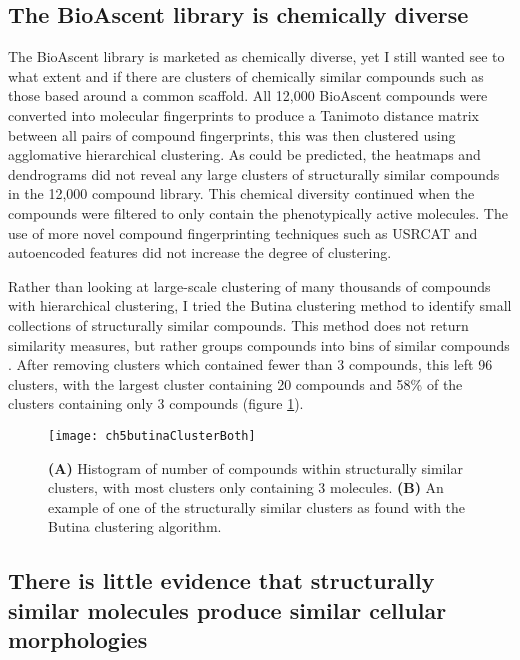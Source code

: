 \documentclass[a4paper,11pt,twoside,openright]{scrbook}
\begin{document}
\subsection{The BioAscent library is chemically diverse}
The BioAscent library is marketed as chemically diverse, yet I still wanted see to what extent and if there are clusters of chemically similar compounds such as those based around a common scaffold.
All 12,000 BioAscent compounds were converted into molecular fingerprints to produce a Tanimoto distance matrix between all pairs of compound fingerprints, this was then clustered using agglomative hierarchical clustering.
As could be predicted, the heatmaps and dendrograms did not reveal any large clusters of structurally similar compounds in the 12,000 compound library.
This chemical diversity continued when the compounds were filtered to only contain the phenotypically active molecules.
The use of more novel compound fingerprinting techniques such as USRCAT \cite{Schreyer2012} and autoencoded features \cite{Gomez-Bombarelli2016} did not increase the degree of clustering.


Rather than looking at large-scale clustering of many thousands of compounds with hierarchical clustering, I tried the Butina clustering method to identify small collections of structurally similar compounds.
This method does not return similarity measures, but rather groups compounds into bins of similar compounds \cite{Butina1999}.
After removing clusters which contained fewer than 3 compounds, this left 96 clusters, with the largest cluster containing 20 compounds and 58\% of the clusters containing only 3 compounds (figure \ref{figure:butina_clusters}).

\begin{figure}
    \captionsetup{width=0.8\textwidth}
    \caption[Histogram of structural cluster sizes and example of molecules within a cluster]{
        \textbf{(A)} Histogram of number of compounds within structurally similar clusters, with most clusters only containing 3 molecules.
        \textbf{(B)} An example of one of the structurally similar clusters as found with the Butina clustering algorithm. 
}
    \texttt{[image: ch5butinaClusterBoth]}
    \label{figure:butina_clusters}
\end{figure}



\subsection{There is little evidence that structurally similar molecules produce similar cellular morphologies}
\end{document}
